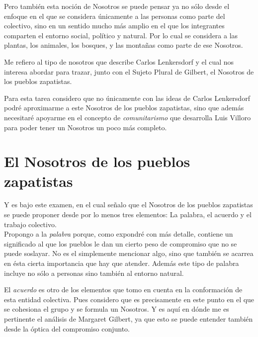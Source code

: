 \documentclass[oneside]{book}
\begin{document}
Pero también esta noción de Nosotros se puede pensar ya no sólo desde el enfoque en el que se considera únicamente a las personas como parte del colectivo, sino en un sentido mucho más amplio en el que los integrantes comparten el entorno social, político y natural. Por lo cual se considera a las plantas, los animales, los bosques, y las montañas como parte de ese Nosotros. 

Me refiero al tipo de nosotros que describe Carlos Lenkersdorf y el cual nos interesa abordar para trazar, junto con el Sujeto Plural de Gilbert, el Nosotros de los pueblos zapatistas.

Para esta tarea considero que no únicamente con las ideas de Carlos Lenkersdorf podré aproximarme a este Nosotros de los pueblos zapatistas, sino que además necesitaré apoyarme en el concepto de \textit{comunitarismo} que desarrolla Luis Villoro para poder tener un Nosotros un poco más completo.

\chapter{El Nosotros de los pueblos zapatistas}

Y es bajo este examen, en el cual señalo que el Nosotros de los pueblos zapatistas se puede proponer desde por lo menos tres elementos: La palabra, el acuerdo y el trabajo colectivo.
\\

Propongo a la \textit{palabra} porque, como expondré con más detalle, contiene un significado al que los pueblos le dan un cierto peso de compromiso que no se puede soslayar. No es el simplemente mencionar algo, sino que también se acarrea en ésta cierta importancia que hay que atender. Además este tipo de palabra incluye no sólo a personas sino también al entorno natural.

El \textit{acuerdo} es otro de los elementos que tomo en cuenta en la conformación de esta entidad colectiva. Pues considero que es precisamente en este punto en el que se cohesiona el grupo y se formula un Nosotros. Y es aquí en dónde me es pertinente el análisis de Margaret Gilbert, ya que esto se puede entender también desde la óptica del compromiso conjunto.    
\end{document}
